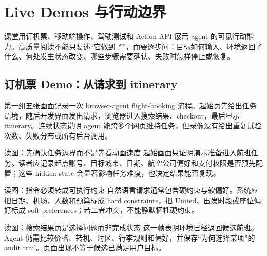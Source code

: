 \section{Live Demos 与行动边界}

课堂用订机票、移动端操作、驾驶测试和 Action API 展示 agent 的可见行动能力。高质量阅读不能只复述“它做到了”，而要逐步问：目标如何输入、环境返回了什么、何处发生状态改变、哪些步骤需要确认、失败时怎样停止或恢复。

\subsection{订机票 Demo：从请求到 itinerary}

第一组五张画面记录一次 browser-agent flight-booking 流程。起始页先给出任务语境，随后开发界面发出请求，浏览器进入搜索结果、checkout，最后显示 itinerary。连续状态说明 agent 能跨多个网页维持任务，但录像没有给出重复试验次数、失败分布或所有后台调用。


\begin{knowledgebox}{读图：先确认任务边界而不是先看动画速度}
起始画面只证明演示准备进入航班任务。读者应记录起点账号、目标城市、日期、航空公司偏好和支付权限是否预先配置；这些 hidden state 会显著影响任务难度，也决定结果能否复现。
\end{knowledgebox}


\begin{knowledgebox}{读图：指令必须转成可执行约束}
自然语言请求通常包含硬约束与软偏好。系统应把日期、机场、人数和预算标成 hard constraints，把 United、出发时段或座位偏好标成 soft preferences；若二者冲突，不能静默牺牲硬约束。
\end{knowledgebox}


\begin{knowledgebox}{读图：搜索结果页是选择问题而非完成状态}
这一帧表明环境已经返回候选航班。Agent 仍需比较价格、转机、时区、行李规则和偏好，并保存“为何选择某项”的 audit trail。页面出现不等于候选已满足用户目标。
\end{knowledgebox}


